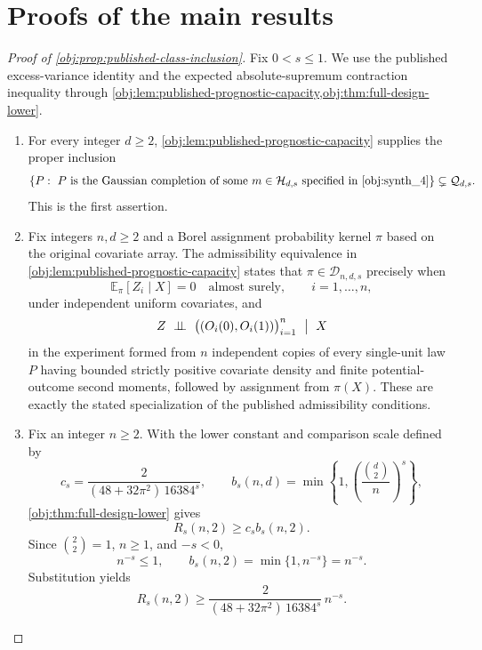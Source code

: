 \documentclass[11pt]{article}
\begin{document}
\section{Proofs of the main results}\label{sec:deferred-proofs}

\begin{proof}[Proof of \cref{obj:prop:published-class-inclusion}]
Fix \(0<s\leq1\). We use the published excess-variance identity
\citep[Proposition 2.3, equation (2.4), under Assumption 2.1 and Definition 2.2]{Cytrynbaum2026Limits}
and the expected absolute-supremum contraction inequality
\citep[Theorem 12(4), with Definition 2]{BartlettMendelson2002Complexities}
through \cref{obj:lem:published-prognostic-capacity,obj:thm:full-design-lower}.

\begin{enumerate}
\item For every integer \(d\geq2\), \cref{obj:lem:published-prognostic-capacity} supplies the proper inclusion
\[
\left\{
P:\ P\text{ is the Gaussian completion of some }
m\in\mathcal H_{d,s}\text{ specified in }\cref{obj:synth_4}
\right\}
\subsetneq\mathcal Q_{d,s}.
\]
This is the first assertion.

\item Fix integers \(n,d\geq2\) and a Borel assignment probability kernel \(\pi\) based on the original covariate array. The admissibility equivalence in
\cref{obj:lem:published-prognostic-capacity} states that
\(\pi\in\mathcal D_{n,d,s}\) precisely when
\[
\mathbb E_\pi[Z_i\mid X]=0
\quad\text{almost surely},\qquad i=1,\ldots,n,
\]
under independent uniform covariates, and
\[
Z\ \perp\!\!\!\perp\
\bigl((O_i(0),O_i(1))\bigr)_{i=1}^n
\ \bigm|\ X
\]
in the experiment formed from \(n\) independent copies of every single-unit law \(P\) having bounded strictly positive covariate density and finite potential-outcome second moments, followed by assignment from \(\pi(X)\). These are exactly the stated specialization of the published admissibility conditions.

\item Fix an integer \(n\geq2\). With the lower constant and comparison scale defined by
\[
c_s=\frac{2}{(48+32\pi^2)\,16384^s},
\qquad
b_s(n,d)=\min\left\{1,\left(\frac{\binom d2}{n}\right)^s\right\},
\]
\cref{obj:thm:full-design-lower} gives
\[
R_s(n,2)\geq c_s b_s(n,2).
\]
Since \(\binom22=1\), \(n\geq1\), and \(-s<0\),
\[
n^{-s}\leq1,
\qquad
b_s(n,2)=\min\{1,n^{-s}\}=n^{-s}.
\]
Substitution yields
\[
R_s(n,2)\geq
\frac{2}{(48+32\pi^2)\,16384^s}\,n^{-s}.
\]


\end{enumerate}
\end{proof}
\end{document}
